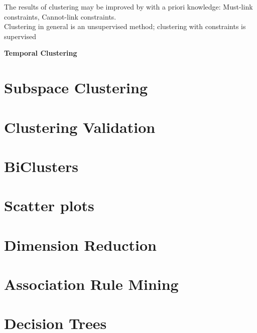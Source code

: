 \documentclass[11pt,ngerman]{article}
\begin{document}
The results of clustering may be improved by with a priori knowledge: Must-link constraints, Cannot-link constraints.\\
Clustering in general is an unsupervised method;
clustering with constraints is supervised

\textbf{Temporal Clustering}




\section{Subspace Clustering}


\section{Clustering Validation}


\section{BiClusters}


\section{Scatter plots}


\section{Dimension Reduction}


\section{Association Rule Mining}


\section{Decision Trees}
\end{document}
